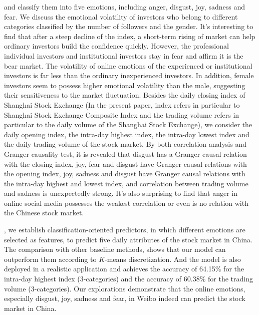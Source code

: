 \documentclass[aps,preprint,groupedaddress]{revtex4-1}
\begin{document}
{\color{black}{In this study, we collect over ten million Chinese stock-relevant tweets from Weibo}} and classify them into five emotions, including anger, disgust, joy, sadness and fear. We discuss the emotional volatility of investors who belong to different categories classified by the number of followers and the gender. It's interesting to find that after a steep decline of the index, a short-term rising of market can help ordinary investors build the confidence quickly. However, the professional individual investors and institutional investors stay in fear and affirm it is the bear market. The volatility of online emotions of the experienced or institutional investors is far less than the ordinary inexperienced investors. In addition, female investors seem to possess higher emotional volatility than the male, suggesting their sensitiveness to the market fluctuation. Besides the daily closing index of Shanghai Stock Exchange (In the present paper, index refers in particular to Shanghai Stock Exchange Composite Index and the trading volume refers in particular to the daily volume of the Shanghai Stock Exchange), we consider the daily opening index, the intra-day highest index, the intra-day lowest index and the daily trading volume of the stock market. By both correlation analysis and Granger causality test, it is revealed that disgust has a Granger causal relation with the closing index, joy, fear and disgust have Granger causal relations with the opening index, joy, sadness and disgust have Granger causal relations with the intra-day highest and lowest index, and correlation between trading volume and sadness is unexpectedly strong. It's also surprising to find that anger in online social media possesses the weakest correlation or even is no relation with the Chinese stock market{\color{black}{, except for the experienced users (less than 2\% of the total investors yet less emotional as compared to others), for whom anger demonstrates a slightly significant connection of Granger causality with the market}}.

{\color{black}{According to these findings}}, we establish classification-oriented predictors, in which different emotions are selected as features, to predict five daily attributes of the stock market in China. The comparison with other baseline methods, {\color{black}{including the one taking purely financial time series as input features}} shows that our model can outperform them according to $K$-means discretization. And the model is also deployed in a realistic application and achieves the accuracy of 64.15\% for the intra-day highest index (3-categories) and the accuracy of 60.38\% for the trading volume (3-categories). Our explorations demonstrate that the online emotions, especially disgust, joy, sadness and fear, in Weibo indeed can predict the stock market in China.
\end{document}
